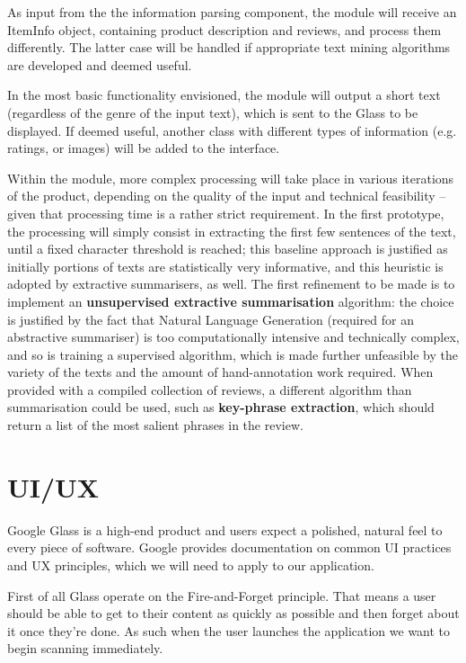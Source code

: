 \documentclass[12pt,a4paper]{report}
\begin{document}
As input from the the information parsing component, the module will receive an ItemInfo object, containing product description and reviews, and process them differently. The latter case will be handled if appropriate text mining algorithms are developed and deemed useful.

In the most basic functionality envisioned, the module will output a short text (regardless of the genre of the input text), which is sent to the Glass to be displayed. If deemed useful, another class with different types of information (e.g. ratings, or images) will be added to the interface.

Within the module, more complex processing will take place in various iterations of the product, depending on the quality of the input and technical feasibility – given that processing time is a rather strict requirement.
In the first prototype, the processing will simply consist in extracting the first few sentences of the text, until a fixed character threshold is reached; this baseline approach is justified as initially portions of texts are statistically very informative, and this heuristic is adopted by extractive summarisers, as well.
The first refinement to be made is to implement an \textbf{unsupervised extractive summarisation} algorithm: the choice is justified by the fact that Natural Language Generation (required for an abstractive summariser) is too computationally intensive and technically complex, and so is training a supervised algorithm, which is made further unfeasible by the variety of the texts and the amount of hand-annotation work required.
When provided with a compiled collection of reviews, a different algorithm than summarisation could be used, such as \textbf{key-phrase extraction}, which should return a list of the most salient phrases in the review.


\section{UI/UX}

Google Glass is a high-end product and users expect a polished, natural feel to every piece of software. Google provides documentation on common UI practices and UX principles, which we will need to apply to our application.

First of all Glass operate on the Fire-and-Forget principle. That means a user should be able to get to their content as quickly as possible and then forget about it once they’re done. As such when the user launches the application we want to begin scanning immediately.
\end{document}
